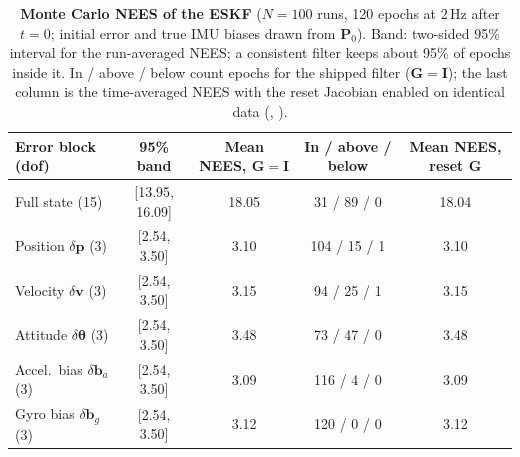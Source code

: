 \begin{table}[t]
\centering
\caption{\textbf{Monte Carlo NEES of the ESKF} ($N=100$ runs, 120 epochs at 2\,Hz after $t=0$; initial error and true IMU biases drawn from $\mathbf{P}_0$). Band: two-sided 95\% interval for the run-averaged NEES; a consistent filter keeps about 95\% of epochs inside it. In / above / below count epochs for the shipped filter ($\mathbf{G}=\mathbf{I}$); the last column is the time-averaged NEES with the reset Jacobian enabled on identical data (, ).}\label{tab:nees}
\small
\begin{tabular}{@{}lcccc@{}}
\toprule
Error block (dof) & 95\% band & Mean NEES, $\mathbf{G}=\mathbf{I}$ & In / above / below & Mean NEES, reset $\mathbf{G}$ \\
\midrule
Full state (15) & [13.95, 16.09] & 18.05 & 31 / 89 / 0 & 18.04 \\
Position $\delta\mathbf{p}$ (3) & [2.54, 3.50] & 3.10 & 104 / 15 / 1 & 3.10 \\
Velocity $\delta\mathbf{v}$ (3) & [2.54, 3.50] & 3.15 & 94 / 25 / 1 & 3.15 \\
Attitude $\delta\boldsymbol{\theta}$ (3) & [2.54, 3.50] & 3.48 & 73 / 47 / 0 & 3.48 \\
Accel.\ bias $\delta\mathbf{b}_a$ (3) & [2.54, 3.50] & 3.09 & 116 / 4 / 0 & 3.09 \\
Gyro bias $\delta\mathbf{b}_g$ (3) & [2.54, 3.50] & 3.12 & 120 / 0 / 0 & 3.12 \\
\bottomrule
\end{tabular}
\end{table}
